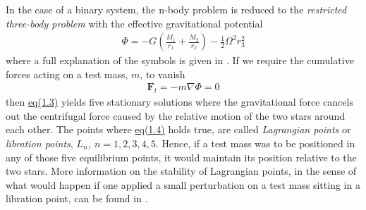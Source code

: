 \documentclass[../../main/thesis_msc.tex]{subfiles}
\begin{document}
				In the case of a binary system, the n-body problem is reduced to the \emph{restricted three-body problem} with the effective gravitational potential 
					\begin{eqnarray}
						\label{eq:eff_potential}
						\Phi = -G \left( \frac{M_1}{r_1} + \frac{M_2}{r_2} \right) - \frac{1}{2} \Omega^2 r_3^2
					\end{eqnarray}
					where a full explanation of the symbols is given in \cite[p.~639]{Tauris_2006}. If we require the cumulative forces acting on a test mass, $m$, to vanish
					\begin{eqnarray}
						\label{eq:cum_force}
						\pmb{F}_t = -m \nabla \Phi = 0
					\end{eqnarray}
				then \hyperref[eq:eff_potential]{eq(1.3)} yields five stationary solutions where the gravitational force cancels out the centrifugal force caused by the relative motion of the two stars around each other. The points where \hyperref[eq:cum_force]{eq(1.4)} holds true, are called \emph{Lagrangian points} or \emph{libration points}, \emph{$L_n$, $n=1,2,3,4,5$}. Hence, if a test mass was to be positioned in any of those five equilibrium points, it would maintain its position relative to the two stars. More information on the stability of Lagrangian points, in the sense of what would happen if one applied a small perturbation on a test mass sitting in a libration point, can be found in \cite{Szebehely, Celletti1990, Schwarz2012}.
				
\end{document}
